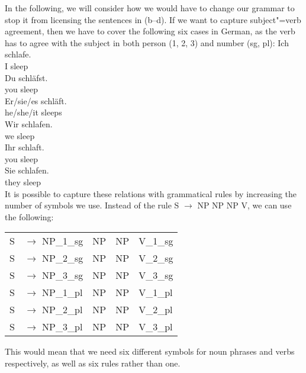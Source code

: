 In the following, we will consider how we would have to change our grammar to stop it from licensing the sentences in (b--d).
If we want to capture subject"=verb agreement, then we have to cover the following six cases in German, as the verb has to agree with the
subject in both person (1, 2, 3) and number (sg, pl):
\eal\jamwidth=7cm\relax%
\ex 
\gll Ich schlafe.\\
     I   sleep\\      
\ex 
\gll Du schläfst.\\
     you sleep\\      
\ex 
\gll Er/sie/es schläft.\\
     he/she/it sleeps\\      
\ex 
\gll Wir schlafen.\\
     we sleep\\       
\ex 
\gll Ihr schlaft.\\
     you sleep\\       
\ex 
\gll Sie schlafen.\\   
     they sleep\\      
\zl
It is possible to capture these relations with grammatical rules by increasing 
the number of symbols we use. Instead of the rule S $\to$ NP NP NP V, we can use
the following:
\ea
\begin{tabular}[t]{@{}l@{ }l@{~~}l@{~~}l@{~~}l}
S  & $\to$ NP\_1\_sg & NP & NP & V\_1\_sg\\
S  & $\to$ NP\_2\_sg & NP & NP & V\_2\_sg\\
S  & $\to$ NP\_3\_sg & NP & NP & V\_3\_sg\\
S  & $\to$ NP\_1\_pl & NP & NP & V\_1\_pl\\
S  & $\to$ NP\_2\_pl & NP & NP & V\_2\_pl\\
S  & $\to$ NP\_3\_pl & NP & NP & V\_3\_pl\\
\end{tabular}
\z
This would mean that we need six different symbols for noun phrases and verbs respectively, as well as six rules rather than one.

